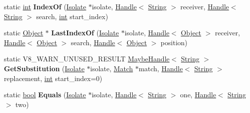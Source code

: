 \begin{DoxyCompactItemize}
\item 
\mbox{\label{classv8_1_1internal_1_1String_ad2cd6aa48efe5dd028b87bf512758f39}} 
static \mbox{\hyperlink{classint}{int}} {\bfseries Index\+Of} (\mbox{\hyperlink{classv8_1_1internal_1_1Isolate}{Isolate}} $\ast$isolate, \mbox{\hyperlink{classv8_1_1internal_1_1Handle}{Handle}}$<$ \mbox{\hyperlink{classv8_1_1internal_1_1String}{String}} $>$ receiver, \mbox{\hyperlink{classv8_1_1internal_1_1Handle}{Handle}}$<$ \mbox{\hyperlink{classv8_1_1internal_1_1String}{String}} $>$ search, \mbox{\hyperlink{classint}{int}} start\+\_\+index)
\item 
\mbox{\label{classv8_1_1internal_1_1String_aa7d8b66b17267ff0eabb5d4e38f28fd3}} 
static \mbox{\hyperlink{classv8_1_1internal_1_1Object}{Object}} $\ast$ {\bfseries Last\+Index\+Of} (\mbox{\hyperlink{classv8_1_1internal_1_1Isolate}{Isolate}} $\ast$isolate, \mbox{\hyperlink{classv8_1_1internal_1_1Handle}{Handle}}$<$ \mbox{\hyperlink{classv8_1_1internal_1_1Object}{Object}} $>$ receiver, \mbox{\hyperlink{classv8_1_1internal_1_1Handle}{Handle}}$<$ \mbox{\hyperlink{classv8_1_1internal_1_1Object}{Object}} $>$ search, \mbox{\hyperlink{classv8_1_1internal_1_1Handle}{Handle}}$<$ \mbox{\hyperlink{classv8_1_1internal_1_1Object}{Object}} $>$ position)
\item 
\mbox{\label{classv8_1_1internal_1_1String_a1f9fa557c13efda57613229ae74b7c01}} 
static V8\+\_\+\+W\+A\+R\+N\+\_\+\+U\+N\+U\+S\+E\+D\+\_\+\+R\+E\+S\+U\+LT \mbox{\hyperlink{classv8_1_1internal_1_1MaybeHandle}{Maybe\+Handle}}$<$ \mbox{\hyperlink{classv8_1_1internal_1_1String}{String}} $>$ {\bfseries Get\+Substitution} (\mbox{\hyperlink{classv8_1_1internal_1_1Isolate}{Isolate}} $\ast$isolate, \mbox{\hyperlink{classv8_1_1internal_1_1String_1_1Match}{Match}} $\ast$match, \mbox{\hyperlink{classv8_1_1internal_1_1Handle}{Handle}}$<$ \mbox{\hyperlink{classv8_1_1internal_1_1String}{String}} $>$ replacement, \mbox{\hyperlink{classint}{int}} start\+\_\+index=0)
\item 
\mbox{\label{classv8_1_1internal_1_1String_af98c14db0cd3469cbe329baef0116efd}} 
static \mbox{\hyperlink{classbool}{bool}} {\bfseries Equals} (\mbox{\hyperlink{classv8_1_1internal_1_1Isolate}{Isolate}} $\ast$isolate, \mbox{\hyperlink{classv8_1_1internal_1_1Handle}{Handle}}$<$ \mbox{\hyperlink{classv8_1_1internal_1_1String}{String}} $>$ one, \mbox{\hyperlink{classv8_1_1internal_1_1Handle}{Handle}}$<$ \mbox{\hyperlink{classv8_1_1internal_1_1String}{String}} $>$ two)

\end{DoxyCompactItemize}

